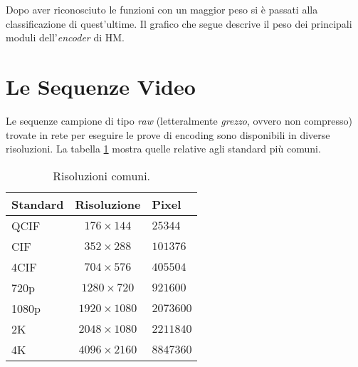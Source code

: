Dopo aver riconosciuto le funzioni con un maggior peso si è passati alla 
classificazione di quest'ultime. Il grafico che segue descrive il peso dei 
principali moduli dell'\textit{encoder} di HM. \\



\section{Le Sequenze Video}
Le sequenze campione di tipo \emph{raw} (letteralmente \emph{grezzo}, ovvero 
non compresso) trovate in rete per eseguire le prove di encoding sono 
disponibili in diverse risoluzioni. La tabella \ref{tabel-resolutions} mostra 
quelle relative agli standard più comuni.

\begin{table}[H]
  \centering
  \begin{tabular}{|l|c|l|}
    \hline
    Standard & Risoluzione & Pixel \\ \hline \hline \hline
    QCIF & $176\times144$ & $25344$ \\ \hline
    CIF & $352\times288$ & $101376$ \\ \hline
    4CIF & $704\times576$ & $405504$ \\ \hline
    720p & $1280\times720$ & $921600$ \\ \hline
    1080p & $1920\times1080$ & $2073600$ \\ \hline
    2K & $2048\times1080$ & $2211840$ \\ \hline
    4K & $4096\times2160$ & $8847360$ \\ \hline
  \end{tabular}
  \caption{Risoluzioni comuni.}
  \label{tabel-resolutions}
\end{table}

